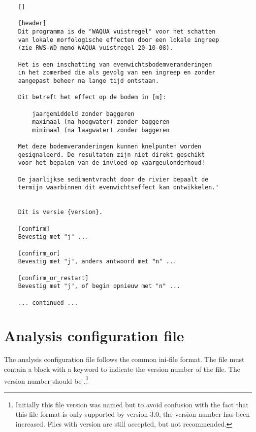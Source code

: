 \begin{Verbatim}
    []
    
    [header]
    Dit programma is de "WAQUA vuistregel" voor het schatten
    van lokale morfologische effecten door een lokale ingreep
    (zie RWS-WD memo WAQUA vuistregel 20-10-08).
    
    Het is een inschatting van evenwichtsbodemveranderingen
    in het zomerbed die als gevolg van een ingreep en zonder
    aangepast beheer na lange tijd ontstaan.
    
    Dit betreft het effect op de bodem in [m]:
    
        jaargemiddeld zonder baggeren
        maximaal (na hoogwater) zonder baggeren
        minimaal (na laagwater) zonder baggeren
    
    Met deze bodemveranderingen kunnen knelpunten worden
    gesignaleerd. De resultaten zijn niet direkt geschikt
    voor het bepalen van de invloed op vaargeulonderhoud!
    
    De jaarlijkse sedimentvracht door de rivier bepaalt de
    termijn waarbinnen dit evenwichtseffect kan ontwikkelen.'
    
    
    Dit is versie {version}.
    
    [confirm]
    Bevestig met "j" ...
    
    [confirm_or]
    Bevestig met "j", anders antwoord met "n" ...
    
    [confirm_or_restart]
    Bevestig met "j", of begin opnieuw met "n" ...
    
    ... continued ...
\end{Verbatim}

\section{Analysis configuration file}\label{app:config}

The analysis configuration file follows the common ini-file format.
The file must contain a \keyw{[General]} block with a keyword  to indicate the version number of the file.
The version number should be .\footnote{Initially this file version was named  but to avoid confusion with the fact that this file format is only supported by \dfastmi version 3.0, the version number has been increased.
Files with version  are still accepted, but not recommended.}

